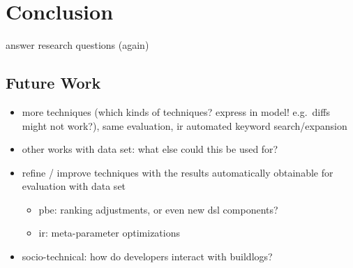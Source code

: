 \documentclass[\myrootdir/main.tex]{subfiles}
\begin{document}
\chapter{Conclusion}
\label{sec:conclusion}
answer research questions (again)

\section{Future Work}
\label{sec:fw}
\begin{itemize}
  \item more techniques (which kinds of techniques? express in model! e.g.\ diffs might not work?), same evaluation, ir automated keyword search/expansion
  \item other works with data set: what else could this be used for?
  \item refine / improve techniques with the results automatically obtainable for evaluation with data set
    \begin{itemize}
      \item pbe: ranking adjustments, or even new dsl components?
      \item ir: meta-parameter optimizations
    \end{itemize}
  \item socio-technical: how do developers interact with buildlogs?
\end{itemize}
\end{document}
